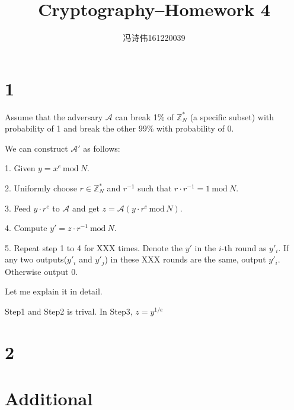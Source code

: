 \documentclass[a4papers]{ctexart}
\title{Cryptography--Homework 4}
\author{冯诗伟161220039}
\date{}
\newcommand{\mr}[1]{\ \mathrm{#1}\ }
\begin{document}
\maketitle
\section*{1}
Assume that the adversary $\mathcal{A}$ can break 1$\%$ of $\mathbb{Z}_N^*$ (a specific subset)
with probability of 1 and break the other 99$\%$ with probability of 0.
 
We can construct $\mathcal{A'}$ as follows:

1. Given $y=x^e \mr{mod} N$.

2. Uniformly choose $r \in \mathbb{Z}_N^*$ and $r^{-1}$ such that $r\cdot r^{-1} = 1 \mr{mod} N$.

3. Feed $y\cdot r^e$ to $\mathcal{A}$ and get $z = \mathcal{A}(y\cdot r^e\, \mathrm{mod}\, N)$.

4. Compute $y' = z\cdot r^{-1} \mr{mod} N$.

5. Repeat step 1 to 4 for XXX times. Denote the $y'$ in the $i$-th round as $y'_i$.
If any two outputs($y'_i$ and $y'_j$) in these XXX rounds are the same, output $y'_i$. 
Otherwise output 0.

Let me explain it in detail.

Step1 and Step2 is trival. In Step3, $z=y^{1/e}$

\section*{2}
\section*{Additional}
\end{document}
